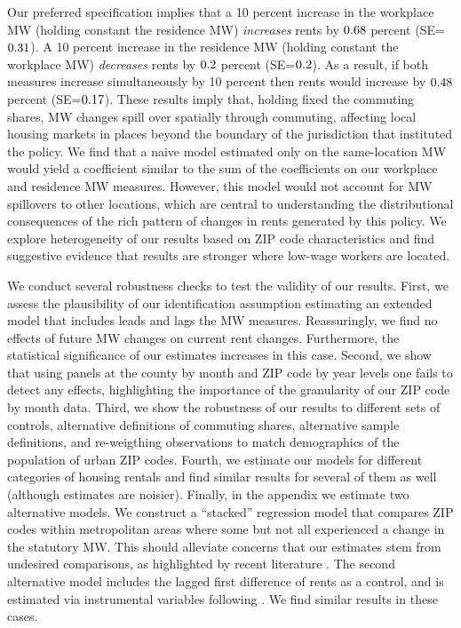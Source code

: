 
Our preferred specification implies that 
a 10 percent increase in the workplace MW (holding constant the residence MW) 
\textit{increases} rents by $\textnormal{0.68}$ percent 
(SE=$\textnormal{0.31}$).
A 10 percent increase in the residence MW (holding constant the workplace MW) 
\textit{decreases} rents by $\textnormal{0.2}$ percent 
(SE=$\textnormal{0.2}$). 
As a result, if both measures increase simultaneously by 10 percent then 
rents would increase by $\textnormal{0.48}$ percent 
(SE=$\textnormal{0.17}$).
These results imply that, holding fixed the commuting shares, MW 
changes spill over spatially through commuting, affecting local housing markets 
in places beyond the boundary of the jurisdiction that instituted the policy.
We find that a naive model estimated only on the same-location MW would yield a 
coefficient similar to the sum of the coefficients on our workplace and 
residence MW measures.
However, this model would not account for MW spillovers to other locations, 
which are central to understanding the distributional consequences of the rich 
pattern of changes in rents generated by this policy.
We explore heterogeneity of our results based on ZIP code characteristics and
find suggestive evidence that results are stronger where low-wage workers are 
located.


We conduct several robustness checks to test the validity of our results.
First, we assess the plausibility of our identification assumption estimating 
an extended model that includes leads and lags the MW measures.
Reassuringly, we find no effects of future MW changes on current rent changes.
Furthermore, the statistical significance of our estimates increases in 
this case.
Second, we show that using panels at the county by month and ZIP code by year 
levels one fails to detect any effects, highlighting the importance of the 
granularity of our ZIP code by month data.
Third, we show the robustness of our results to different sets of controls,
alternative definitions of commuting shares, alternative sample definitions,
and re-weigthing observations to match demographics of the population of
urban ZIP codes.
Fourth, we estimate our models for different categories of housing rentals and
find similar results for several of them as well (although estimates are noisier).
Finally, in the appendix we estimate two alternative models.
We construct a ``stacked'' regression model that compares ZIP codes within 
metropolitan areas where some but not all experienced a change in the 
statutory MW.
This should alleviate concerns that our estimates stem from undesired 
comparisons, as highlighted by recent literature 
\parencite{deChaisemartinEtAl2022,RothEtAl2022}.
The second alternative model includes the lagged first difference of rents as 
a control, and is estimated via instrumental variables following 
\textcite{ArellanoBond1991}.
We find similar results in these cases.


